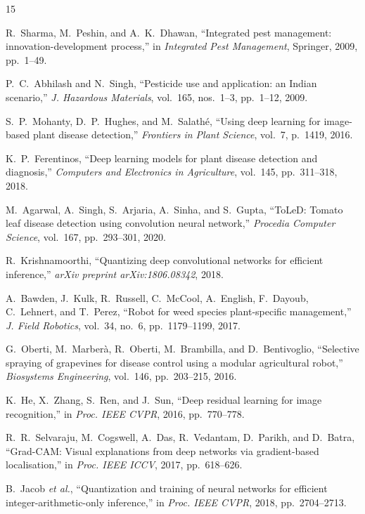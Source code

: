 \documentclass[conference]{IEEEtran}
\begin{document}
\begin{thebibliography}{15}

R.~Sharma, M.~Peshin, and A.~K.~Dhawan, ``Integrated pest management:
innovation-development process,'' in \emph{Integrated Pest Management},
Springer, 2009, pp.~1--49.

P.~C.~Abhilash and N.~Singh, ``Pesticide use and application: an Indian
scenario,'' \emph{J. Hazardous Materials}, vol.~165, nos.~1--3,
pp.~1--12, 2009.

S.~P.~Mohanty, D.~P.~Hughes, and M.~Salath\'{e}, ``Using deep learning for
image-based plant disease detection,'' \emph{Frontiers in Plant Science},
vol.~7, p.~1419, 2016.

K.~P.~Ferentinos, ``Deep learning models for plant disease detection and
diagnosis,'' \emph{Computers and Electronics in Agriculture}, vol.~145,
pp.~311--318, 2018.

M.~Agarwal, A.~Singh, S.~Arjaria, A.~Sinha, and S.~Gupta, ``ToLeD:
Tomato leaf disease detection using convolution neural network,''
\emph{Procedia Computer Science}, vol.~167, pp.~293--301, 2020.

R.~Krishnamoorthi, ``Quantizing deep convolutional networks for efficient
inference,'' \emph{arXiv preprint arXiv:1806.08342}, 2018.

A.~Bawden, J.~Kulk, R.~Russell, C.~McCool, A.~English, F.~Dayoub,
C.~Lehnert, and T.~Perez, ``Robot for weed species plant-specific
management,'' \emph{J. Field Robotics}, vol.~34, no.~6, pp.~1179--1199,
2017.

G.~Oberti, M.~Marber\`{a}, R.~Oberti, M.~Brambilla, and
D.~Bentivoglio, ``Selective spraying of grapevines for disease control
using a modular agricultural robot,'' \emph{Biosystems Engineering},
vol.~146, pp.~203--215, 2016.

K.~He, X.~Zhang, S.~Ren, and J.~Sun, ``Deep residual learning for image
recognition,'' in \emph{Proc. IEEE CVPR}, 2016, pp.~770--778.

R.~R.~Selvaraju, M.~Cogswell, A.~Das, R.~Vedantam, D.~Parikh, and
D.~Batra, ``Grad-CAM: Visual explanations from deep networks via
gradient-based localisation,'' in \emph{Proc. IEEE ICCV}, 2017,
pp.~618--626.

B.~Jacob \emph{et al.}, ``Quantization and training of neural networks
for efficient integer-arithmetic-only inference,'' in \emph{Proc. IEEE
CVPR}, 2018, pp.~2704--2713.


\end{thebibliography}
\end{document}
